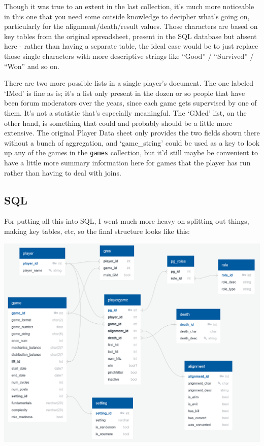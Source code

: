 \documentclass[11pt, oneside]{amsart}   	%
\begin{document}
Though it was true to an extent in the last collection, it's much more noticeable in this one that you need some outside knowledge to decipher what's going on, particularly for the alignment/death/result values. Those characters are based on key tables from the original spreadsheet, present in the SQL database but absent here - rather than having a separate table, the ideal case would be to just replace those single characters with more descriptive strings like ``Good'' / ``Survived'' / ``Won'' and so on. 

There are two more possible lists in a single player's document. The one labeled `IMed' is fine as is; it's a list only present in the dozen or so people that have been forum moderators over the years, since each game gets supervised by one of them. It's not a statistic that's especially meaningful. The `GMed' list, on the other hand, is something that could and probably should be a little more extensive. The original Player Data sheet only provides the two fields shown there without a bunch of aggregation, and `game\_string' could be used as a key to look up any of the games in the \texttt{games} collection, but it'd still maybe be convenient to have a little more summary information here for games that the player has run rather than having to deal with joins. 

\subsection{SQL}

For putting all this into SQL, I went much more heavy on splitting out things, making key tables, etc, so the final structure looks like this: 

\includegraphics[scale=0.5]{../diagrams/se diagram v3.png}
\end{document}

